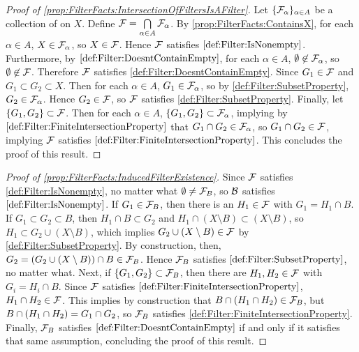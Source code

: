 \begin{prop}
\begin{proof}[Proof of \ref{prop:FilterFacts:IntersectionOfFiltersIsAFilter}]
        Let $\{\mathcal{F}_\alpha\}_{\alpha \in A}$ be a collection of \Filters on $X$. 
        Define $\mathcal{F}=\bigcap\limits_{\alpha \in A} \mathcal{F}_\alpha$. 
        By \ref{prop:FilterFacts:ContainsX}, for each $\alpha \in A$, 
        $X \in \mathcal{F}_\alpha$, so $X \in \mathcal{F}$.
        Hence $\mathcal{F}$ satisfies $\ref{def:Filter:IsNonempty}$.
        Furthermore, by $\ref{def:Filter:DoesntContainEmpty}$, for each 
        $\alpha \in A$, $\emptyset \not \in \mathcal{F}_\alpha$, so 
        $\emptyset \not \in \mathcal{F}$. Therefore $\mathcal{F}$ satisfies \ref{def:Filter:DoesntContainEmpty}.
        Since $G_1 \in \mathcal{F}$ and $G_1 \subset G_2 \subset X$. 
        Then for each $\alpha \in A$, $G_1 \in \mathcal{F}_\alpha$, so by 
        \ref{def:Filter:SubsetProperty}, $G_2 \in \mathcal{F}_\alpha$.
        Hence $G_2 \in \mathcal{F}$, so $\mathcal{F}$ satisfies \ref{def:Filter:SubsetProperty}. 
        Finally, let $\{G_1,G_2\} \subset \mathcal{F}$. 
        Then for each $\alpha \in A$, $\{G_1,G_2\} \subset \mathcal{F}_\alpha$, 
        implying by $\ref{def:Filter:FiniteIntersectionProperty}$ that 
        $G_1 \cap G_2 \in \mathcal{F}_\alpha$, so $G_1\cap G_2 \in \mathcal{F}$, 
        implying $\mathcal{F}$ satisfies $\ref{def:Filter:FiniteIntersectionProperty}$. 
        This concludes the proof of this result. 
    \end{proof}
    \begin{proof}[Proof of \ref{prop:FilterFacts:InducedFilterExistence}]
       Since $\mathcal{F}$ satisfies \ref{def:Filter:IsNonempty}, 
       no matter what $\emptyset \neq \mathcal{F}_B$, 
       so $\mathcal{B}$ satisfies $\ref{def:Filter:IsNonempty}$.
       If $G_1 \in \mathcal{F}_B$, then there is an $H_1 \in \mathcal{F}$ with $G_1 = H_1 \cap B$. 
       If $G_1 \subset G_2 \subset B$, 
       then $H_1 \cap B \subset G_2$ 
       and $H_1 \cap (X \setminus B) \subset (X \setminus B)$, 
       so $H_1 \subset G_2 \cup (X \setminus B)$, 
       which implies $G_2 \cup (X \setminus B) \in \mathcal{F}$ by \ref{def:Filter:SubsetProperty}.
       By construction, then, $G_2 = \left( G_2 \cup (X \setminus B) \right) \cap B \in \mathcal{F}_B$.
       Hence $\mathcal{F}_B$ satisfies $\ref{def:Filter:SubsetProperty}$, no matter what. 
       Next, if $\{G_1, G_2 \} \subset \mathcal{F}_B$, then there are $H_1,H_2 \in \mathcal{F}$ 
       with $G_i = H_i \cap B$. 
       Since $\mathcal{F}$ satisfies $\ref{def:Filter:FiniteIntersectionProperty}$, 
       $H_1 \cap H_2 \in \mathcal{F}$. 
       This implies by construction that $B \cap \left( H_1 \cap H_2\right) \in \mathcal{F}_B$, but 
       $B \cap \left( H_1 \cap H_2\right) = G_1 \cap G_2 $, so $\mathcal{F}_B$ satisfies 
       \ref{def:Filter:FiniteIntersectionProperty}. 
       Finally, 
       $\mathcal{F}_B$ satisfies $\ref{def:Filter:DoesntContainEmpty}$ 
       if and only if it satisfies that same assumption, concluding the proof of this result. 
    \end{proof}
\end{prop}

